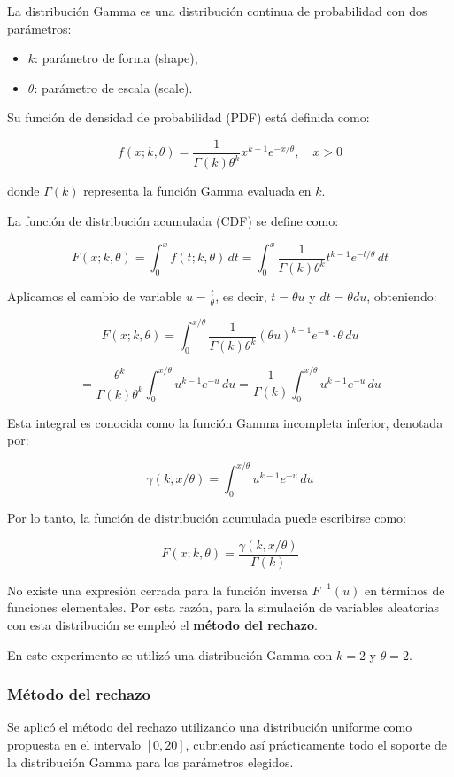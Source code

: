 \documentclass{article}
\begin{document}
La distribución Gamma es una distribución continua de probabilidad con dos parámetros:
\begin{itemize}
    \item $k$: parámetro de forma (shape),
    \item $\theta$: parámetro de escala (scale).
\end{itemize}

Su función de densidad de probabilidad (PDF) está definida como:

\[
f(x; k, \theta) = \frac{1}{\Gamma(k)\theta^k} x^{k-1} e^{-x/\theta}, \quad x > 0
\]

donde $\Gamma(k)$ representa la función Gamma evaluada en $k$.

La función de distribución acumulada (CDF) se define como:

\[
F(x; k, \theta) = \int_0^x f(t; k, \theta) \, dt = \int_0^x \frac{1}{\Gamma(k)\theta^k} t^{k-1} e^{-t/\theta} \, dt
\]

Aplicamos el cambio de variable \( u = \frac{t}{\theta} \), es decir, \( t = \theta u \) y \( dt = \theta du \), obteniendo:

\[
F(x; k, \theta) = \int_0^{x/\theta} \frac{1}{\Gamma(k)\theta^k} (\theta u)^{k-1} e^{-u} \cdot \theta \, du
\]

\[
= \frac{\theta^k}{\Gamma(k)\theta^k} \int_0^{x/\theta} u^{k-1} e^{-u} \, du = \frac{1}{\Gamma(k)} \int_0^{x/\theta} u^{k-1} e^{-u} \, du
\]

Esta integral es conocida como la función Gamma incompleta inferior, denotada por:

\[
\gamma(k, x/\theta) = \int_0^{x/\theta} u^{k-1} e^{-u} \, du
\]

Por lo tanto, la función de distribución acumulada puede escribirse como:

\[
F(x; k, \theta) = \frac{\gamma(k, x/\theta)}{\Gamma(k)}
\]

No existe una expresión cerrada para la función inversa \( F^{-1}(u) \) en términos de funciones elementales. Por esta razón, para la simulación de variables aleatorias con esta distribución se empleó el \textbf{método del rechazo}.

En este experimento se utilizó una distribución Gamma con $k = 2$ y $\theta = 2$.

\subsubsection{Método del rechazo}

Se aplicó el método del rechazo utilizando una distribución uniforme como propuesta en el intervalo $[0, 20]$, cubriendo así prácticamente todo el soporte de la distribución Gamma para los parámetros elegidos.
\end{document}
